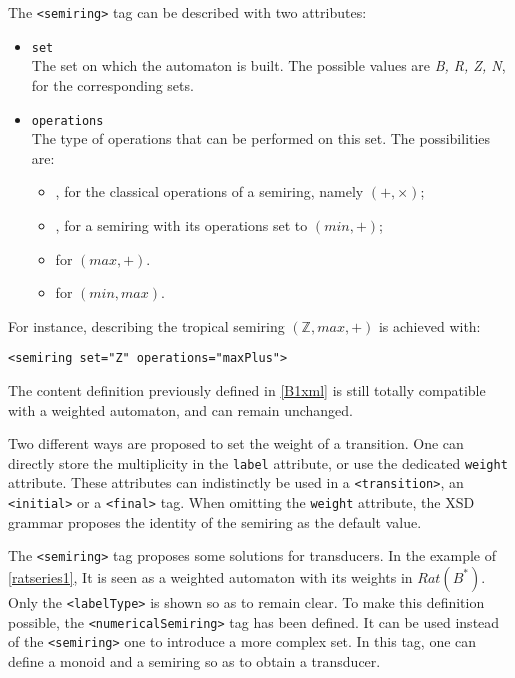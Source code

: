\documentclass[a4paper]{article}
\newcommand{\xtag}[1]{\texttt{<#1>}}
\newcommand{\xattr}[1]{\texttt{#1}}
\begin{document}
The \xtag{semiring} tag can be described with two attributes:
\begin{itemize}
\item \xattr{set}\\
  The set on which the automaton is built. The possible values are
\textit{B, R, Z, N}, for the corresponding sets.
\item \xattr{operations}\\
  The type of operations that can be performed on this set.  The
  possibilities are:
  \begin{itemize}
  \item {}, for the classical operations of a semiring, namely
    $(+, \times)$;
  \item {}, for a semiring with its operations set to $(min, +)$;
  \item {} for $(max, +)$.
  \item {} for $(min, max)$.
  \end{itemize}
\end{itemize}

For instance, describing the tropical semiring $({\mathbb Z}, max, +)$
is achieved with:
\begin{center}
{\small
\verb|<semiring set="Z" operations="maxPlus">|}
\end{center}

The content definition previously defined in \autoref{B1xml} is
still totally compatible with a weighted automaton, and can remain
unchanged.

Two different ways are proposed to set the weight of a transition. One
can directly store the multiplicity in the \xattr{label} attribute, or
use the dedicated \xattr{weight} attribute. These attributes can
indistinctly be used in a \xtag{transition}, an \xtag{initial} or a
\xtag{final} tag. When omitting the \xattr{weight} attribute, the XSD
grammar proposes the identity of the semiring as the default value.

\medskip

The \xtag{semiring} tag proposes some solutions for transducers.
In the example of \autoref{ratseries1}, It is seen as a weighted automaton
with its weights in $Rat(B^*)$. Only the \xtag{labelType} is shown so as to
remain clear.
To make this definition possible, the \xtag{numericalSemiring} tag has been
defined. It can be used instead of the \xtag{semiring} one to introduce a more
complex set. In this tag, one can define a monoid and a semiring so as to obtain
a transducer.
\end{document}
